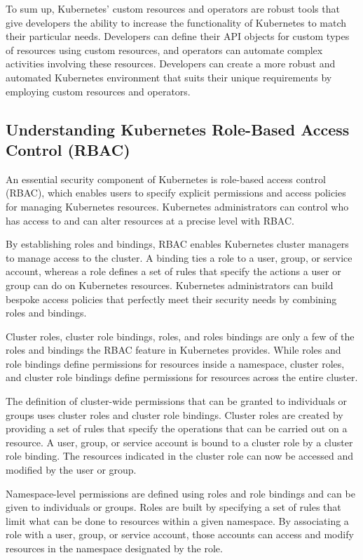 To sum up, Kubernetes' custom resources and operators are robust tools that give developers the ability to increase the functionality of Kubernetes to match their particular needs. Developers can define their API objects for custom types of resources using custom resources, and operators can automate complex activities involving these resources. Developers can create a more robust and automated Kubernetes environment that suits their unique requirements by employing custom resources and operators.


\subsection{Understanding Kubernetes Role-Based Access Control (RBAC)}

An essential security component of Kubernetes is role-based access control (RBAC), which enables users to specify explicit permissions and access policies for managing Kubernetes resources. Kubernetes administrators can control who has access to and can alter resources at a precise level with RBAC.

By establishing roles and bindings, RBAC enables Kubernetes cluster managers to manage access to the cluster. A binding ties a role to a user, group, or service account, whereas a role defines a set of rules that specify the actions a user or group can do on Kubernetes resources. Kubernetes administrators can build bespoke access policies that perfectly meet their security needs by combining roles and bindings.

Cluster roles, cluster role bindings, roles, and roles bindings are only a few of the roles and bindings the RBAC feature in Kubernetes provides. While roles and role bindings define permissions for resources inside a namespace, cluster roles, and cluster role bindings define permissions for resources across the entire cluster.

The definition of cluster-wide permissions that can be granted to individuals or groups uses cluster roles and cluster role bindings. Cluster roles are created by providing a set of rules that specify the operations that can be carried out on a resource. A user, group, or service account is bound to a cluster role by a cluster role binding. The resources indicated in the cluster role can now be accessed and modified by the user or group.

Namespace-level permissions are defined using roles and role bindings and can be given to individuals or groups. Roles are built by specifying a set of rules that limit what can be done to resources within a given namespace. By associating a role with a user, group, or service account, those accounts can access and modify resources in the namespace designated by the role.

